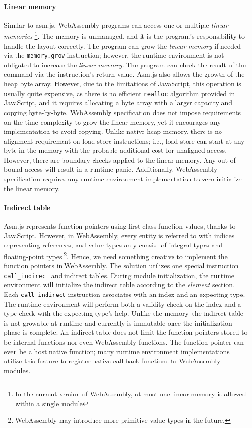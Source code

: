 \paragraph{Linear memory}
Similar to asm.js, WebAssembly programs can access one or multiple
\emph{linear memories} \footnote{In the current version of WebAssembly, at most
  one linear memory is allowed within a single module}. The memory is unmanaged,
and it is the program's responsibility to handle the layout correctly. The
program can grow the \emph{linear memory} if needed via the \texttt{memory.grow}
instruction; however, the runtime environment is not obligated to increase the
\emph{linear memory}. The program can check the result of the command via the
instruction's return value. Asm.js also allows the growth of the heap byte
array. However, due to the limitations of JavaScript, this operation is usually
quite expensive, as there is no efficient \texttt{realloc} algorithm provided in
JavaScript, and it requires allocating a byte array with a larger capacity and
copying byte-by-byte. WebAssembly specification does not impose requirements on
the time complexity to grow the linear memory, yet it encourages any
implementation to avoid copying.  Unlike native heap memory, there is no
alignment requirement on load-store instructions; i.e., load-store can start at
any byte in the memory with the probable additional cost for unaligned access.
However, there are boundary checks applied to the linear memory. Any
out-of-bound access will result in a runtime panic. Additionally, WebAssembly
specification requires any runtime environment implementation to
zero-initialize the linear memory.

\paragraph{Indirect table}
Asm.js represents function pointers using first-class function values, thanks to
JavaScript. However, in WebAssembly, every entity is referred to with indices
representing references, and value types only consist of integral types and
floating-point types \footnote{WebAssembly may introduce more primitive value
  types in the future.}. Hence, we need something creative to implement the
function pointers in WebAssembly. The solution utilizes one special instruction
\texttt{call\_indirect} and indirect tables. During module initialization, the
runtime environment will initialize the indirect table according to the
\emph{element} section. Each \texttt{call\_indirect} instruction associates
with an index and an expecting type. The runtime environment will perform both
a validity check on the index and a type check with the expecting type's help.
Unlike the memory, the indirect table is not growable at runtime and currently
is immutable once the initialization phase is complete. An indirect table does
not limit the function pointers stored to be internal functions nor even
WebAssembly functions. The function pointer can even be a host native function;
many runtime environment implementations utilize this feature to register
native call-back functions to WebAssembly modules.

